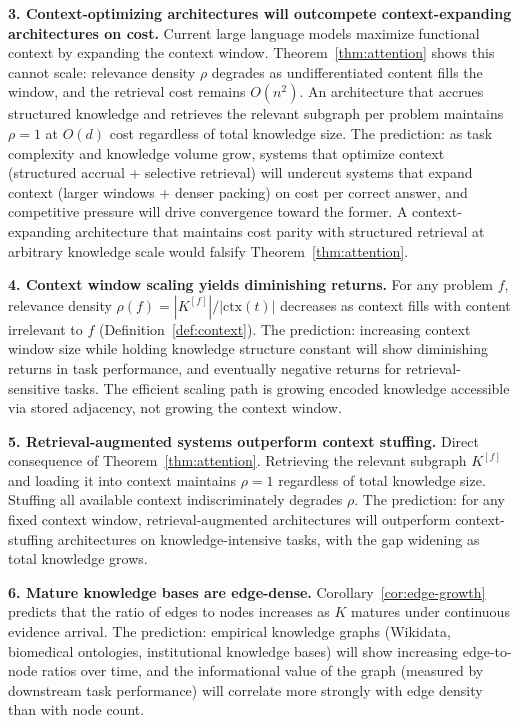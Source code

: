 \documentclass[11pt]{article}
\theoremstyle{definition}
\begin{document}
\textbf{3. Context-optimizing architectures will outcompete
context-expanding architectures on cost.}
Current large language models maximize functional context by expanding
the context window. Theorem~\ref{thm:attention} shows this cannot
scale: relevance density $\rho$ degrades as undifferentiated content
fills the window, and the retrieval cost remains $O(n^2)$. An
architecture that accrues structured knowledge and retrieves the
relevant subgraph per problem maintains $\rho = 1$ at $O(d)$ cost
regardless of total knowledge size. The prediction: as task complexity
and knowledge volume grow, systems that optimize context (structured
accrual + selective retrieval) will undercut systems that expand context
(larger windows + denser packing) on cost per correct answer, and
competitive pressure will drive convergence toward the former. A
context-expanding architecture that maintains cost parity with
structured retrieval at arbitrary knowledge scale would falsify
Theorem~\ref{thm:attention}.

\textbf{4. Context window scaling yields diminishing returns.}
For any problem $f$, relevance density
$\rho(f) = |K^{[f]}| / |\mathrm{ctx}(t)|$ decreases as context fills
with content irrelevant to $f$ (Definition~\ref{def:context}). The
prediction: increasing context window size while holding knowledge
structure constant will show diminishing returns in task performance,
and eventually negative returns for retrieval-sensitive tasks. The
efficient scaling path is growing encoded knowledge accessible via
stored adjacency, not growing the context window.

\textbf{5. Retrieval-augmented systems outperform context stuffing.}
Direct consequence of Theorem~\ref{thm:attention}. Retrieving the
relevant subgraph $K^{[f]}$ and loading it into context maintains
$\rho = 1$ regardless of total knowledge size. Stuffing all available
context indiscriminately degrades $\rho$. The prediction: for any fixed
context window, retrieval-augmented architectures will outperform
context-stuffing architectures on knowledge-intensive tasks, with the
gap widening as total knowledge grows.

\textbf{6. Mature knowledge bases are edge-dense.}
Corollary~\ref{cor:edge-growth} predicts that the ratio of edges to
nodes increases as $K$ matures under continuous evidence arrival. The
prediction: empirical knowledge graphs (Wikidata, biomedical
ontologies, institutional knowledge bases) will show increasing
edge-to-node ratios over time, and the informational value of the graph
(measured by downstream task performance) will correlate more strongly
with edge density than with node count.
\end{document}
